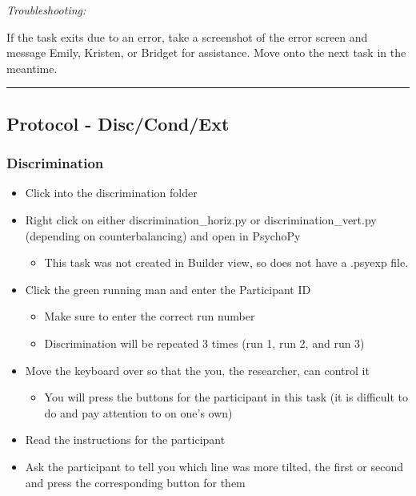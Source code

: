 \documentclass[]{book}
\providecommand{\tightlist}{%
  \setlength{\itemsep}{0pt}\setlength{\parskip}{0pt}}
\begin{document}
\emph{Troubleshooting:}

If the task exits due to an error, take a screenshot of the error screen and message Emily, Kristen, or Bridget for assistance. Move onto the next task in the meantime.

\begin{center}\rule{0.5\linewidth}{0.5pt}\end{center}

\hypertarget{protocol---disccondext}{%
\subsection{Protocol - Disc/Cond/Ext}\label{protocol---disccondext}}

\hypertarget{discrimination}{%
\subsubsection{Discrimination}\label{discrimination}}

\begin{itemize}
\tightlist
\item
  Click into the discrimination folder
\item
  Right click on either discrimination\_horiz.py or discrimination\_vert.py (depending on counterbalancing) and open in PsychoPy

  \begin{itemize}
  \tightlist
  \item
    This task was not created in Builder view, so does not have a .psyexp file.
  \end{itemize}
\item
  Click the green running man and enter the Participant ID

  \begin{itemize}
  \tightlist
  \item
    Make sure to enter the correct run number
  \item
    Discrimination will be repeated 3 times (run 1, run 2, and run 3)
  \end{itemize}
\item
  Move the keyboard over so that the you, the researcher, can control it

  \begin{itemize}
  \tightlist
  \item
    You will press the buttons for the participant in this task (it is difficult to do and pay attention to on one's own)
  \end{itemize}
\item
  Read the instructions for the participant
\item
  Ask the participant to tell you which line was more tilted, the first or second and press the corresponding button for them
\end{itemize}
\end{document}
